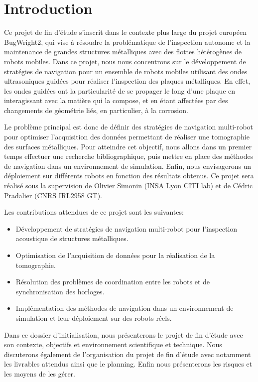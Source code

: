 \documentclass[init,francais,RandD]{rapportPFE}
\begin{document}
	\section{Introduction}
		Ce projet de fin d'étude s'inscrit dans le contexte plus large du projet européen BugWright2, qui vise à résoudre la problématique de l'inspection autonome et la maintenance de grandes structures métalliques avec des flottes hétérogènes de robots mobiles. Dans ce projet, nous nous concentrons sur le développement de stratégies de navigation pour un ensemble de robots mobiles utilisant des ondes ultrasoniques guidées pour réaliser l'inspection des plaques métalliques. En effet, les ondes guidées ont la particularité de se propager le long d'une plaque en interagissant avec la matière qui la compose, et en étant affectées par des changements de géométrie liés, en particulier, à la corrosion.

		Le problème principal est donc de définir des stratégies de navigation multi-robot pour optimiser l'acquisition des données permettant de réaliser une tomographie des surfaces métalliques. Pour atteindre cet objectif, nous allons dans un premier temps effectuer une recherche bibliographique, puis mettre en place des méthodes de navigation dans un environnement de simulation. Enfin, nous envisagerons un déploiement sur différents robots en fonction des résultats obtenus. Ce projet sera réalisé sous la supervision de Olivier Simonin (INSA Lyon CITI lab) et de Cédric Pradalier (CNRS IRL2958 GT).

		Les contributions attendues de ce projet sont les suivantes:
		\begin{itemize}
			\item Développement de stratégies de navigation multi-robot pour l'inspection acoustique de structures métalliques.
			\item Optimisation de l'acquisition de données pour la réalisation de la tomographie.
			\item Résolution des problèmes de coordination entre les robots et de synchronisation des horloges.
			\item Implémentation des méthodes de navigation dans un environnement de simulation et leur déploiement sur des robots réels.
		\end{itemize}

		Dans ce dossier d'initialisation, nous présenterons le projet de fin d'étude avec son contexte, objectifs et environnement scientifique et technique. Nous discuterons également de l'organisation du projet de fin d'étude avec notamment les livrables attendus ainsi que le planning. Enfin nous présenterons les risques et les moyens de les gérer.
\end{document}
